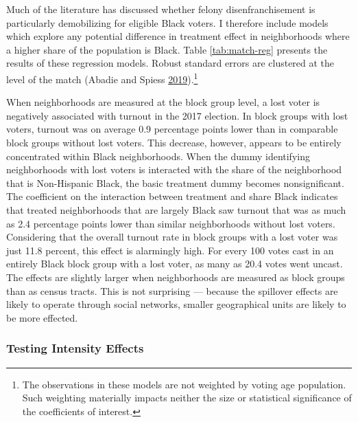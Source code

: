 \documentclass[]{article}
\let\rmarkdownfootnote\footnote%
\def\footnote{\protect\rmarkdownfootnote}
\begin{document}
Much of the literature has discussed whether felony disenfranchisement is particularly demobilizing for eligible Black voters. I therefore include models which explore any potential difference in treatment effect in neighborhoods where a higher share of the population is Black. Table \ref{tab:match-reg} presents the results of these regression models. Robust standard errors are clustered at the level of the match (Abadie and Spiess \protect\hyperlink{ref-Abadie2019}{2019}).\footnote{The observations in these models are not weighted by voting age population. Such weighting materially impacts neither the size or statistical significance of the coefficients of interest.}



When neighborhoods are measured at the block group level, a lost voter is negatively associated with turnout in the 2017 election. In block groups with lost voters, turnout was on average 0.9 percentage points lower than in comparable block groups without lost voters. This decrease, however, appears to be entirely concentrated within Black neighborhoods. When the dummy identifying neighborhoods with lost voters is interacted with the share of the neighborhood that is Non-Hispanic Black, the basic treatment dummy becomes nonsignificant. The coefficient on the interaction between treatment and share Black indicates that treated neighborhoods that are largely Black saw turnout that was as much as 2.4 percentage points lower than similar neighborhoods without lost voters. Considering that the overall turnout rate in block groups with a lost voter was just 11.8 percent, this effect is alarmingly high. For every 100 votes cast in an entirely Black block group with a lost voter, as many as 20.4 votes went uncast. The effects are slightly larger when neighborhoods are measured as block groups than as census tracts. This is not surprising --- because the spillover effects are likely to operate through social networks, smaller geographical units are likely to be more effected.

\hypertarget{testing-intensity-effects}{%
\subsubsection*{Testing Intensity Effects}\label{testing-intensity-effects}}
\end{document}
